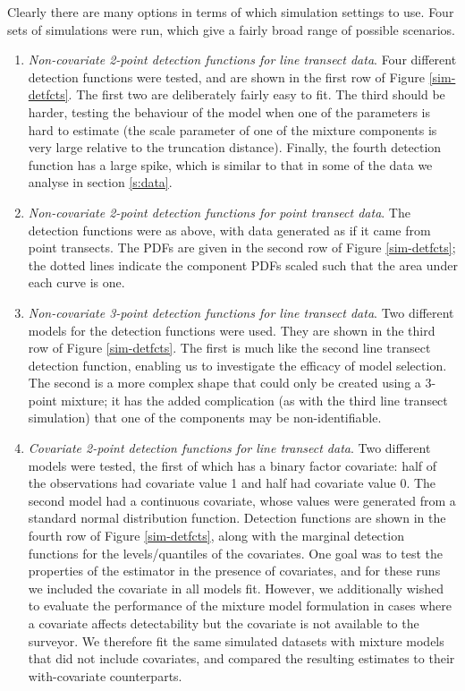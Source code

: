 Clearly there are many options in terms of which simulation settings to use. Four sets of simulations were run, which give a fairly broad range of possible scenarios.
\begin{enumerate}
	\item \textit{Non-covariate 2-point detection functions for line transect data}. Four different detection functions were tested, and are shown in the first row of Figure \ref{sim-detfcts}. The first two are deliberately fairly easy to fit. The third should be harder, testing the behaviour of the model when one of the parameters is hard to estimate (the scale parameter of one of the mixture components is very large relative to the truncation distance). Finally, the fourth detection function has a large spike, which is similar to that in some of the data we analyse in section \ref{s:data}.
	\item \textit{Non-covariate 2-point detection functions for point transect data}.  The detection functions were as above, with data generated as if it came from point transects. The PDFs are given in the second row of Figure \ref{sim-detfcts}; the dotted lines indicate the component PDFs scaled such that the area under each curve is one.
	\item \textit{Non-covariate 3-point detection functions for line transect data}. Two different models for the detection functions were used. They are shown in the third row of Figure \ref{sim-detfcts}. The first is much like the second line transect detection function, enabling us to investigate the efficacy of model selection. The second is a more complex shape that could only be created using a 3-point mixture; it has the added complication (as with the third line transect simulation) that one of the components may be non-identifiable.
	\item \textit{Covariate 2-point detection functions for line transect data}. Two different models were tested, the first of which has a binary factor covariate: half of the observations had covariate value 1 and half had covariate value 0. The second model had a continuous covariate, whose values were generated from a standard normal distribution function. Detection functions are shown in the fourth row of Figure \ref{sim-detfcts}, along with the marginal detection functions for the levels/quantiles of the covariates. One goal was to test the properties of the estimator in the presence of covariates, and for these runs we included the covariate in all models fit.  However, we additionally wished to evaluate the performance of the mixture model formulation in cases where a covariate affects detectability but the covariate is not available to the surveyor.  We therefore fit the same simulated datasets with mixture models that did not include covariates, and compared the resulting estimates to their with-covariate counterparts.
\end{enumerate}

